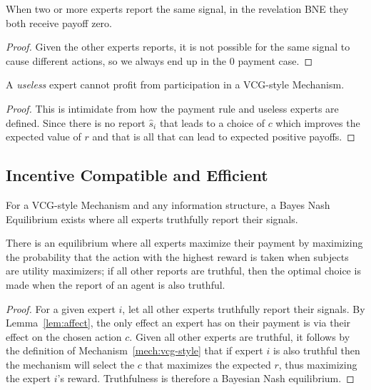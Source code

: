 \begin{prop}
	When two or more experts report the same signal, in the revelation BNE they both receive payoff zero. 
\end{prop}

\begin{proof}
	Given the other experts reports, it is not possible for the same signal to cause different actions, so we always end up in the 0 payment case.
\end{proof}


\begin{prop}
	A \emph{useless} expert cannot profit from participation in a VCG-style Mechanism.
\end{prop}

\begin{proof}
This is intimidate from how the payment rule and useless experts are defined. Since there is no report $\hat{s}_i$ that leads to a choice of $c$ which improves the expected value of $r$ and that is all that can lead to expected positive payoffs.
\end{proof}


\subsection{Incentive Compatible and Efficient}

\begin{thm}
	For a VCG-style Mechanism and any information structure, a Bayes Nash Equilibrium exists where all experts truthfully report their signals.
\end{thm}

There is an equilibrium where all experts maximize their payment by maximizing the probability that the action with the highest reward is taken when subjects are utility maximizers; if all other reports are truthful, then the optimal choice is made when the report of an agent is also truthful.

\begin{proof}
For a given expert $i$, let all other experts truthfully report their signals. By Lemma~\ref{lem:affect}, the only effect an expert has on their payment is via their effect on the chosen action $c$. Given all other experts are truthful, it follows by the definition of Mechanism~\ref{mech:vcg-style} that if expert $i$ is also truthful then the mechanism will select the $c$ that maximizes the expected $r$, thus maximizing the expert $i$'s reward. Truthfulness is therefore a Bayesian Nash equilibrium.
\end{proof}



